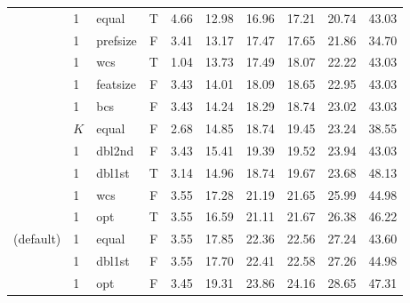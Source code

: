 \begin{table}[ht]
\begin{minipage}{\textwidth}
\begin{tabular}{lllcrrrrrr}
  & 1 & equal & T & 4.66 & 12.98 & 16.96 & 17.21 & 20.74 & 43.03 \\ 
  & 1 & prefsize & F & 3.41 & 13.17 & 17.47 & 17.65 & 21.86 & 34.70 \\ 
  & 1 & wcs & T & 1.04 & 13.73 & 17.49 & 18.07 & 22.22 & 43.03 \\ 
  & 1 & featsize & F & 3.43 & 14.01 & 18.09 & 18.65 & 22.95 & 43.03 \\ 
  & 1 & bcs & F & 3.43 & 14.24 & 18.29 & 18.74 & 23.02 & 43.03 \\ 
  & $K$ & equal & F & 2.68 & 14.85 & 18.74 & 19.45 & 23.24 & 38.55 \\ 
  & 1 & dbl2nd & F & 3.43 & 15.41 & 19.39 & 19.52 & 23.94 & 43.03 \\ 
  & 1 & dbl1st & T & 3.14 & 14.96 & 18.74 & 19.67 & 23.68 & 48.13 \\ 
  & 1 & wcs & F & 3.55 & 17.28 & 21.19 & 21.65 & 25.99 & 44.98 \\ 
  & 1 & opt & T & 3.55 & 16.59 & 21.11 & 21.67 & 26.38 & 46.22 \\ 
(default) & 1 & equal & F & 3.55 & 17.85 & 22.36 & 22.56 & 27.24 & 43.60 \\ 
  & 1 & dbl1st & F & 3.55 & 17.70 & 22.41 & 22.58 & 27.26 & 44.98 \\ 
  & 1 & opt & F & 3.45 & 19.31 & 23.86 & 24.16 & 28.65 & 47.31 \\ 
 \bottomrule
\end{tabular}
\end{minipage}
\end{table}